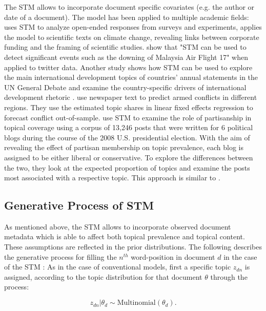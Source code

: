 \documentclass[12pt,a4paper,notitlepage]{article}
\begin{document}
The STM allows to incorporate document specific covariates (e.g. the author or date of a document). The model has been applied to multiple academic fields: \citet{roberts_structural_2014} uses STM to analyze open-ended responses from surveys and experiments, \citet{farrell_corporate_2016} applies the model to scientific texts on climate change, revealing links between corporate funding and the framing of scientific studies. \citet{mishler_using_2015} show that "STM can be used to detect significant events such as the downing of Malaysia Air Flight 17" when applied to twitter data. Another study shows how STM can be used to explore the main international development topics of countries’ annual statements in the UN General Debate and examine the country-specific drivers of international development rhetoric \citep{baturo_what_2017}. \citet{mueller_reading_2016} use newspaper text to predict armed conflicts in different regions. They use the estimated topic shares in linear fixed effects regression to forecast conflict out-of-sample. \citet{roberts_navigating_2016} use STM to examine the role of partisanship in topical coverage using a corpus of 13,246 posts that were written for 6 political blogs during the course of the 2008 U.S. presidential election. With the aim of revealing the effect of partisan membership on topic prevalence, each blog is assigned to be either liberal or conservative. To explore the differences between the two, they look at the expected proportion of topics and examine the posts most associated with a respective topic. This approach is similar to \citet{roberts_model_2016}. 

\subsection{Generative Process of STM}\label{ch_generativeProcess}

 As mentioned above, the STM allows to incorporate observed document metadata which is able to affect both topical prevalence and topical content. These assumptions are reflected in the prior distributions. The following describes the generative process for filling the $n^{th}$ word-position in document $d$ in the case of the STM \citep{roberts_structural_2013}: As in the case of conventional models, first a specific topic $z_{dn}$ is assigned, according to the topic distribution for that document $\theta$ through the process:

\begin{equation}
	z_{dn}|\theta_d \sim \textrm{Multinomial}(\theta_d).
\end{equation}
\end{document}
